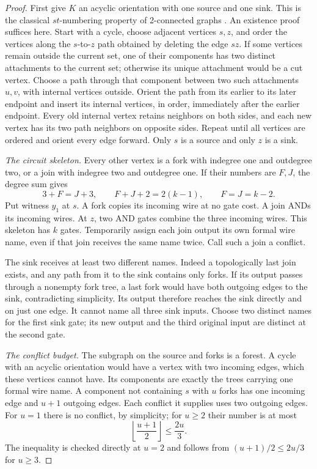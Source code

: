 \begin{proof}
First give $K$ an acyclic orientation with one source and one sink.
This is the classical $st$-numbering property of 2-connected graphs
\citep{EvenTarjan1976}. An existence proof suffices here. Start with
a cycle, choose adjacent vertices $s,z$, and order the vertices along
the $s$-to-$z$ path obtained by deleting the edge $sz$. If some
vertices remain outside the current set, one of their components has
two distinct attachments to the current set; otherwise its unique
attachment would be a cut vertex. Choose a path through that component
between two such attachments $u,v$, with internal vertices outside.
Orient the path from its earlier to its later endpoint and insert its
internal vertices, in order, immediately after the earlier endpoint.
Every old internal vertex retains neighbors on both sides, and each
new vertex has its two path neighbors on opposite sides. Repeat until
all vertices are ordered and orient every edge forward. Only $s$ is
a source and only $z$ is a sink.

\emph{The circuit skeleton.}
Every other vertex is a fork with indegree one and outdegree two,
or a join with indegree two and outdegree one. If their numbers are
$F,J$, the degree sum gives
\[
 3+F=J+3,\qquad F+J+2=2(k-1),\qquad F=J=k-2.
\]
Put witness $y_1$ at $s$. A fork copies its incoming wire at no gate
cost. A join ANDs its incoming wires. At $z$, two AND gates combine
the three incoming wires. This skeleton has $k$ gates.
Temporarily assign each join output its own formal wire name, even
if that join receives the same name twice. Call such a join a conflict.

The sink receives at least two different names. Indeed a topologically
last join exists, and any path from it to the sink contains only forks.
If its output passes through a nonempty fork tree, a last fork would
have both outgoing edges to the sink, contradicting simplicity.
Its output therefore reaches the sink directly and on just one edge.
It cannot name all three sink inputs. Choose two distinct names for
the first sink gate; its new output and the third original input
are distinct at the second gate.

\emph{The conflict budget.}
The subgraph on the source and forks is a forest. A cycle with an
acyclic orientation would have a vertex with two incoming edges,
which these vertices cannot have. Its components are exactly the
trees carrying one formal wire name. A component not containing $s$
with $u$ forks has one incoming edge and $u+1$ outgoing edges. Each
conflict it supplies uses two outgoing edges. For $u=1$ there is no
conflict, by simplicity; for $u\ge2$ their number is at most
\[
 \left\lfloor\frac{u+1}{2}\right\rfloor\le\frac{2u}{3}.
\]
The inequality is checked directly at $u=2$ and follows from
$(u+1)/2\le2u/3$ for $u\ge3$.


\end{proof}

